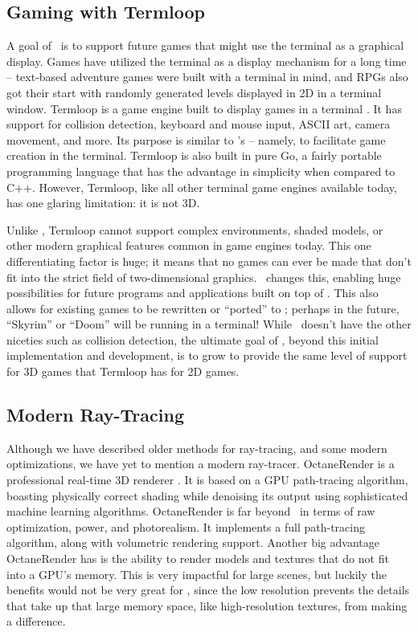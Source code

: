 \subsection{Gaming with Termloop}

A goal of \name\ is to support future games that might use the terminal as a graphical display.
Games have utilized the terminal as a display mechanism for a long time -- text-based adventure games were built with a terminal in mind, and RPGs also got their start with randomly generated levels displayed in 2D in a terminal window.
Termloop is a game engine built to display games in a terminal \cite{termloop}.
It has support for collision detection, keyboard and mouse input, ASCII art, camera movement, and more.
Its purpose is similar to \name's -- namely, to facilitate game creation in the terminal.
Termloop is also built in pure Go, a fairly portable programming language that has the advantage in simplicity when compared to C++.
However, Termloop, like all other terminal game engines available today, has one glaring limitation: it is not 3D.

Unlike \name, Termloop cannot support complex environments, shaded models, or other modern graphical features common in game engines today.
This one differentiating factor is huge; it means that no games can ever be made that don't fit into the strict field of two-dimensional graphics.
\name\ changes this, enabling huge possibilities for future programs and applications built on top of \name.
This also allows for existing games to be rewritten or ``ported'' to \name; perhaps in the future, ``Skyrim'' or ``Doom'' will be running in a terminal!
While \name\ doesn't have the other niceties such as collision detection, the ultimate goal of \name, beyond this initial implementation and development, is to grow to provide the same level of support for 3D games that Termloop has for 2D games.

\subsection{Modern Ray-Tracing}

Although we have described older methods for ray-tracing, and some modern optimizations, we have yet to mention a modern ray-tracer.
OctaneRender is a professional real-time 3D renderer \cite{octane}.
It is based on a GPU path-tracing algorithm, boasting physically correct shading while denoising its output using sophisticated machine learning algorithms.
OctaneRender is far beyond \name\ in terms of raw optimization, power, and photorealism.
It implements a full path-tracing algorithm, along with volumetric rendering support.
Another big advantage OctaneRender has is the ability to render models and textures that do not fit into a GPU's memory.
This is very impactful for large scenes, but luckily the benefits would not be very great for \name, since the low resolution prevents the details that take up that large memory space, like high-resolution textures, from making a difference.

